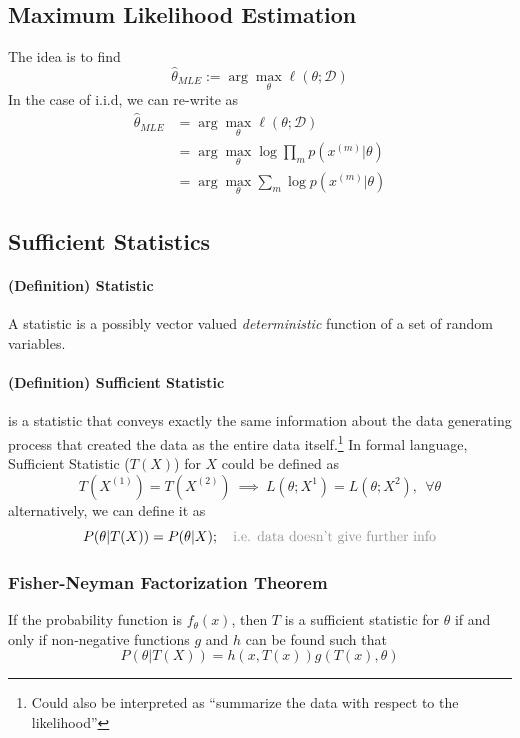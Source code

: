 \documentclass[11pt]{article}
\newcommand{\argmax}{\arg\max}
\begin{document}
\subsection{Maximum Likelihood Estimation}
The idea is to find
\begin{equation*}
    \hat{\theta}_{MLE} := \argmax_\theta \ell(\theta; \mathcal{D})
\end{equation*}
In the case of i.i.d, we can re-write as
\begin{align*}
    \hat{\theta}_{MLE} &= \argmax_\theta \ell(\theta; \mathcal{D})\\
    &= \argmax_\theta \log \prod_{m} p\left(x^{(m)} | \theta\right) \\
    &= \argmax_\theta\sum_{m} \log p\left(x^{(m)} | \theta\right)
\end{align*}

\subsection{Sufficient Statistics}
\paragraph{(Definition) Statistic}
A statistic is a possibly vector valued \textit{deterministic} function of a set of random variables.

\paragraph{(Definition) Sufficient Statistic} 
is a statistic that conveys exactly the same information about the data generating process that created the data as the entire data itself.\footnote{Could also be interpreted as ``summarize the data with respect to the likelihood''} In formal language, Sufficient Statistic ($T(X)$) for $X$ could be defined as
\begin{equation*}
    T(X^{(1)}) = T(X^{(2)})~ \implies~ L(\theta; X^{1}) = L(\theta; X^{2}), ~~\forall \theta
\end{equation*}
alternatively, we can define it as
\begin{equation*}
    P(\theta | T(X)) = P(\theta | X); ~~~\text{\color{Gray} i.e. data doesn't give further info}
\end{equation*}
\subsubsection{Fisher-Neyman Factorization Theorem}
If the probability function is $f_\theta(x)$, then $T$ is a sufficient statistic for $\theta$ if and only if non-negative functions $g$ and $h$ can be found such that
\begin{equation*}
    P(\theta | T(X))=h(x, T(x)) g(T(x), \theta)
\end{equation*}
\end{document}
